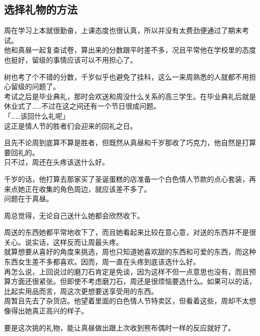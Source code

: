 \subsection{选择礼物的方法}

周在学习上本就很勤奋，上课态度也很认真，所以并没有太费劲便通过了期末考试。\\

他和真昼一起复查试卷，算出来的分数跟平时差不多，况且平常他在学校里的态度也挺好，留级的事情应该可以不用担心了。

树也考了个不错的分数，千岁似乎也避免了挂科，这么一来周熟悉的人就都不用担心留级的问题了。\\

考试之后是毕业典礼，那时会欢送和周没什么关系的高三学生。在毕业典礼后就是休业式了……不过在这之间还有一个节日很成问题。\\

「……该回什么礼呢」\\

这正是情人节的胜者们会迎来的回礼之日。

且先不论周到底算不算是胜者，但既然从真昼和千岁那收了巧克力，他自然是打算要回礼的。\\

只不过，周还在头疼该送什么好。

千岁的话，他打算去那家买了圣诞蛋糕的店准备一个白色情人节款的点心套装，再来点她正在收集的角色周边，就应该差不多了。\\

问题在于真昼。

周总觉得，无论自己送什么她都会欣然收下。

周送的东西她都平常地收下了，而且她看起来比较在意心意，对送的东西并不是很关心。说实话，这样反而让周最头疼。\\

就算想要从喜好的角度来挑选，周也只知道她喜欢甜的东西和可爱的东西，而这种东西女生差不多都喜欢。因而，周一直在头疼到底该选什么好。\\

再怎么说，上回说过的磨刀石肯定是免谈，因为这样不但一点意思也没有，而且预算方面还很紧张。但即使不考虑磨刀石，周还是很烦恼要选什么。如果可以的话，比起实用品而言，周这次更想要送享受用的东西。\\

周暂且先去了杂货店。他望着里面的白色情人节特卖区，但看着这些，周却不太想像得出她真正高兴的样子。

要是这次挑的礼物，能让真昼做出跟上次收到熊布偶时一样的反应就好了。\\

